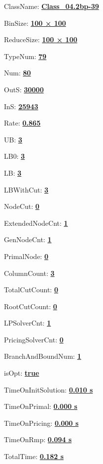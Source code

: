 \documentclass[11pt]{article}
\begin{document}
\pagestyle{empty}


ClassName: \underline{\textbf{Class_04.2bp-39}}
\par
BinSize: \underline{\textbf{100 × 100}}
\par
ReduceSize: \underline{\textbf{100 × 100}}
\par
TypeNum: \underline{\textbf{79}}
\par
Num: \underline{\textbf{80}}
\par
OutS: \underline{\textbf{30000}}
\par
InS: \underline{\textbf{25943}}
\par
Rate: \underline{\textbf{0.865}}
\par
UB: \underline{\textbf{3}}
\par
LB0: \underline{\textbf{3}}
\par
LB: \underline{\textbf{3}}
\par
LBWithCut: \underline{\textbf{3}}
\par
NodeCut: \underline{\textbf{0}}
\par
ExtendedNodeCnt: \underline{\textbf{1}}
\par
GenNodeCnt: \underline{\textbf{1}}
\par
PrimalNode: \underline{\textbf{0}}
\par
ColumnCount: \underline{\textbf{3}}
\par
TotalCutCount: \underline{\textbf{0}}
\par
RootCutCount: \underline{\textbf{0}}
\par
LPSolverCnt: \underline{\textbf{1}}
\par
PricingSolverCnt: \underline{\textbf{0}}
\par
BranchAndBoundNum: \underline{\textbf{1}}
\par
isOpt: \underline{\textbf{true}}
\par
TimeOnInitSolution: \underline{\textbf{0.010 s}}
\par
TimeOnPrimal: \underline{\textbf{0.000 s}}
\par
TimeOnPricing: \underline{\textbf{0.000 s}}
\par
TimeOnRmp: \underline{\textbf{0.094 s}}
\par
TotalTime: \underline{\textbf{0.182 s}}
\par
\newpage
\end{document}

